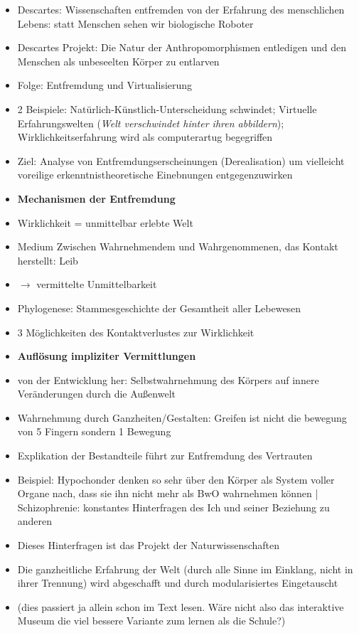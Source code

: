 \documentclass[emulatestandardclasses]{scrartcl}
\begin{document}
\begin{itemize}
  \item Descartes: Wissenschaften entfremden von der Erfahrung des menschlichen Lebens: statt Menschen sehen wir biologische Roboter
  \item Descartes Projekt: Die Natur der Anthropomorphismen entledigen und den Menschen als unbeseelten Körper zu entlarven
  \item Folge: Entfremdung und Virtualisierung
  \item 2 Beispiele: Natürlich-Künstlich-Unterscheidung schwindet; Virtuelle Erfahrungswelten (\emph{Welt verschwindet hinter ihren abbildern}); Wirklichkeitserfahrung wird als computerartug begegriffen
  \item Ziel: Analyse von Entfremdungserscheinungen (Derealisation) um vielleicht voreilige erkenntnistheoretische Einebnungen entgegenzuwirken
  \item \textbf{Mechanismen der Entfremdung}
  \item Wirklichkeit = unmittelbar erlebte Welt
  \item Medium Zwischen Wahrnehmendem und Wahrgenommenen, das Kontakt herstellt: Leib
  \item $\rightarrow$ vermittelte Unmittelbarkeit
  \item Phylogenese: Stammesgeschichte der Gesamtheit aller Lebewesen
  \item 3 Möglichkeiten des Kontaktverlustes zur Wirklichkeit
  \item \textbf{Auflösung impliziter Vermittlungen}
  \item von der Entwicklung her: Selbstwahrnehmung des Körpers auf innere Veränderungen durch die Außenwelt
  \item Wahrnehmung durch Ganzheiten/Gestalten: Greifen ist nicht die bewegung von 5 Fingern sondern 1 Bewegung
  \item Explikation der Bestandteile führt zur Entfremdung des Vertrauten
  \item Beispiel: Hypochonder denken so sehr über den Körper als System voller Organe nach, dass sie ihn nicht mehr als BwO wahrnehmen können | Schizophrenie: konstantes Hinterfragen des Ich und seiner Beziehung zu anderen
  \item Dieses Hinterfragen ist das Projekt der Naturwissenschaften
  \item Die ganzheitliche Erfahrung der Welt (durch alle Sinne im Einklang, nicht in ihrer Trennung) wird abgeschafft und durch modularisiertes Eingetauscht
  \item (dies passiert ja allein schon im Text lesen. Wäre nicht also das interaktive Museum die viel bessere Variante zum lernen als die Schule?)

\end{itemize}
\end{document}
